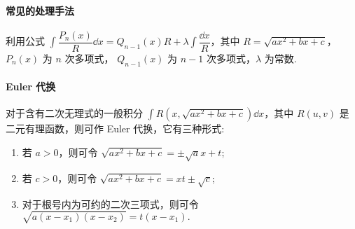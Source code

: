 \paragraph{常见的处理手法}利用公式 $\displaystyle\int\dfrac{P_n(x)}{R}\dd x=Q_{n-1}(x)R+\lambda\int\dfrac{\dd x}{R}$，其中 $R=\sqrt{ax^2+bx+c}$，$P_n(x)$ 为 $n$ 次多项式，
$Q_{n-1}(x)$ 为 $n-1$ 次多项式，$\lambda$ 为常数.

\paragraph{Euler 代换}
对于含有二次无理式的一般积分 $ \displaystyle\int R\left(x, \sqrt{a x^{2}+b x+c}\right) \dd  x$，其中 $ R(u, v) $ 是二元有理函数，则可作 Euler 代换，它有三种形式:
\begin{enumerate}[label=(\arabic{*})]
    \item 若 $ a>0 $，则可令 $ \sqrt{a x^{2}+b x+c}=\pm \sqrt{a} x+t$;
    \item 若 $ c>0 $，则可令 $ \sqrt{a x^{2}+b x+c}=x t \pm \sqrt{c}$;
    \item 对于根号内为可约的二次三项式，则可令 $ \sqrt{a\left(x-x_{1}\right)\left(x-x_{2}\right)}=t\left(x-x_{1}\right).$
\end{enumerate}

